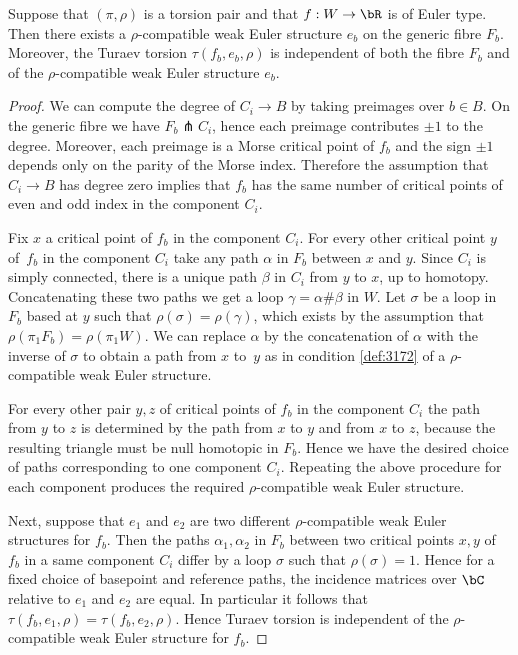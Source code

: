 \begin{lemma}\label{familyturaev}
Suppose that $(\pi, \rho)$ is a torsion pair and that $f:W \to \bR$ is of Euler type. Then there exists a $\rho$-compatible weak Euler structure $e_b$ on the generic fibre $F_b$. Moreover, the Turaev torsion $\tau(f_b,e_b, \rho)$ is independent of both the fibre $F_b$ and of the $\rho$-compatible weak Euler structure $e_b$.
\end{lemma}

\begin{proof} We can compute the degree of $C_i \to B$ by taking preimages over $b \in B$. On the generic fibre we have $F_b \pitchfork C_i$, hence each preimage contributes $\pm 1$ to the degree. Moreover, each preimage is a Morse critical point of $f_b$ and the sign $\pm 1$ depends only on the parity of the Morse index. Therefore the assumption that $C_i \to B$ has degree zero implies that $f_b$ has the same number of critical points of even and odd index in the component $C_i$.

Fix $x$ a critical point of $f_b$ in the component $C_i$. For every other critical point $y$ of~$f_b$ in the component $C_i$ take any path $\alpha$ in $F_b$ between $x$ and $y$. Since $C_i$ is simply connected, there is a unique path $\beta$ in $C_i$ from $y$ to $x$, up to homotopy. Concatenating these two paths we get a loop $\gamma = \alpha \# \beta$ in $W$. Let $\sigma$ be a loop in $F_b$ based at $y$ such that $\rho(\sigma)=\rho(\gamma)$, which exists by the assumption that $\rho(\pi_1F_b)=\rho(\pi_1W)$. We can replace $\alpha$ by the concatenation of $\alpha$ with the inverse of $\sigma$ to obtain a path from $x$ to~$y$ as in condition \eqref{def:3172} of a $\rho$-compatible weak Euler structure.

For every other pair $y,z$ of critical points of $f_b$ in the component $C_i$ the path from $y$ to $z$ is determined by the path from $x$ to $y$ and from $x$ to $z$, because the resulting triangle must be null homotopic in $F_b$. Hence we have the desired choice of paths corresponding to one component $C_i$. Repeating the above procedure for each component produces the required $\rho$-compatible weak Euler structure.

Next, suppose that $e_1$ and $e_2$ are two different $\rho$-compatible weak Euler structures for $f_b$. Then the paths $\alpha_1, \alpha_2$ in $F_b$ between two critical points $x,y$ of $f_b$ in a same component $C_i$ differ by a loop $\sigma$ such that $\rho(\sigma)=1$. Hence for a fixed choice of basepoint and reference paths, the incidence matrices over $\bC$ relative to $e_1$ and $e_2$ are equal. In particular it follows that $\tau(f_b,e_1,\rho)=\tau(f_b, e_2, \rho)$. Hence Turaev torsion is independent of the $\rho$-compatible weak Euler structure for $f_b$.


\end{proof}

